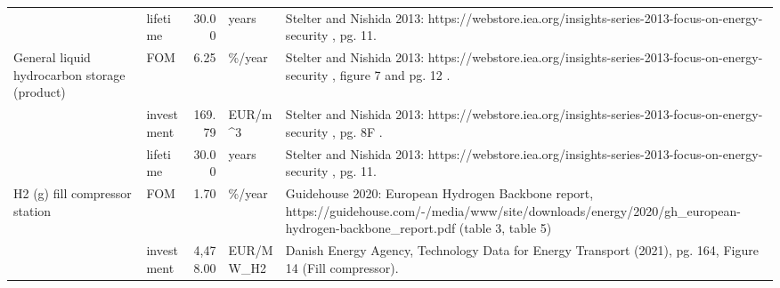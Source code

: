 \begin{longtable}{p{5cm}p{3cm}rp{3cm}p{11cm}}
                      & lifetime &          30.00 &                             years &                                                                                                                                                                                                                           Stelter and Nishida 2013: https://webstore.iea.org/insights-series-2013-focus-on-energy-security , pg. 11. \\
General liquid hydrocarbon storage (product) & FOM &           6.25 &                            \%/year &                                                                                                                                                                                                             Stelter and Nishida 2013: https://webstore.iea.org/insights-series-2013-focus-on-energy-security , figure 7 and pg. 12 . \\
                      & investment &         169.79 &                           EUR/m\textasciicircum 3 &                                                                                                                                                                                                                          Stelter and Nishida 2013: https://webstore.iea.org/insights-series-2013-focus-on-energy-security , pg. 8F . \\
                      & lifetime &          30.00 &                             years &                                                                                                                                                                                                                           Stelter and Nishida 2013: https://webstore.iea.org/insights-series-2013-focus-on-energy-security , pg. 11. \\
H2 (g) fill compressor station & FOM &           1.70 &                            \%/year &                                                                                                                                                        Guidehouse 2020: European Hydrogen Backbone report, https://guidehouse.com/-/media/www/site/downloads/energy/2020/gh\_european-hydrogen-backbone\_report.pdf (table 3, table 5) \\
                      & investment &       4,478.00 &                         EUR/MW\_H2 &                                                                                                                                                                                                                             Danish Energy Agency, Technology Data for Energy Transport (2021), pg. 164, Figure 14 (Fill compressor). \\

\end{longtable}
